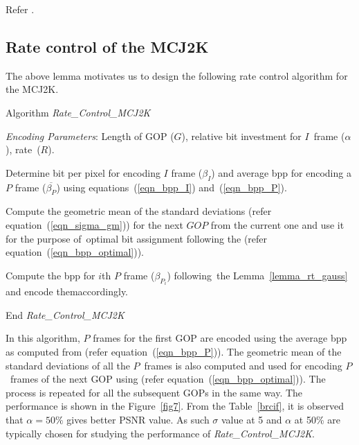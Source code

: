\documentclass{doublecol-new}
\theoremstyle{TH}{
\newtheorem{lemma}{Lemma}[section]
\newtheorem{theorem}{Theorem}
\newtheorem{corrolary}{Corrolary}
\newtheorem{conjecture}[lemma]{Conjecture}
\newtheorem{proposition}[lemma]{Proposition}
\newtheorem{claim}[lemma]{Claim}
\newtheorem{stheorem}[lemma]{Wrong Theorem}
}
\theoremstyle{THrm}{
\newtheorem{definition}{Definition}[section]
\newtheorem{question}{Question}[section]
\newtheorem{remark}{Remark}[section]
\newtheorem{scheme}{Scheme}
}
\theoremstyle{THhit}{
\newtheorem{case}{Case}[section]
}
\begin{document}
 Refer \cite{22}.
\endproof

\subsection{Rate control of the MCJ2K}

The above lemma motivates us to design the following rate control algorithm for
the MCJ2K.

\vspace*{9pt} \noindent
 Algorithm {\it Rate\_Control\_MCJ2K}

\vspace*{8pt}
 \noindent
{\it Encoding Parameters}: Length of GOP ($G$), relative bit investment for
$I$~frame ($\alpha$), rate~($R$).

\begin{NLh}{3}
\item[1] Determine bit per pixel for encoding $I$ frame
($\beta_I$) and average
 bpp for encoding a $P$ frame ($\overline{\beta_P}$) using
 equations~(\ref{eqn_bpp_I}) and~(\ref{eqn_bpp_P}).

\item[2] Compute the geometric mean of the standard
deviations (refer equation~(\ref{eqn_sigma_gm}))  for the next $GOP$ from the
current one and use it for the purpose of~optimal bit assignment following the
(refer equation~(\ref{eqn_bpp_optimal})).

\item[3] Compute the bpp for $i$th $P$ frame ($\beta_{P_i}$)
following~the Lemma~\ref{lemma_rt_gauss} and encode them\break accordingly.
\end{NLh}
\vspace*{0.3pc} \noindent End {\it Rate\_Control\_MCJ2K}

\vspace*{8pt} \noindent
 In this algorithm, $P$ frames for the first GOP are
encoded using the average bpp as computed from (refer
equation~(\ref{eqn_bpp_P})). The geometric mean of the standard deviations of
all the $P$~frames is also computed and used for encoding $P$~frames of the next
GOP using (refer equation~(\ref{eqn_bpp_optimal})). The process is repeated for
all the subsequent GOPs in the same way. The performance is shown in the
Figure~\ref{fig7}. From the Table~\ref{brcif}, it is observed that $\alpha=50\%$
gives better PSNR value. As such $\sigma$ value at 5 and $\alpha$ at 50\% are
typically chosen for studying the performance of {\it Rate\_Control\_MCJ2K}.
\end{document}

